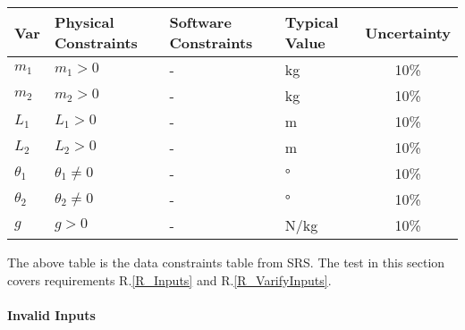 \documentclass[12pt, titlepage]{article}
\begin{document}
\begin{table}[H]
  \caption{Input Variables} \label{TblInputVar}
  \renewcommand{\arraystretch}{1.2}
\noindent \begin{longtable*}{l l l l c} 
  \toprule
  \textbf{Var} & \textbf{Physical Constraints} & \textbf{Software Constraints} &
                             \textbf{Typical Value} & \textbf{Uncertainty}\\
  \midrule 
  $m_1$ & $m_1 > 0$ & - & \si[per-mode=symbol] {\kilogram} & 10\%
  \\
  $m_2$ & $m_2 > 0$ & - & \si[per-mode=symbol] {\kilogram} & 10\%
  \\
  $L_1$ & $L_1 > 0$ & - & \si[per-mode=symbol] {\metre} & 10\%
  \\
  $L_2$ & $L_2 > 0$ & - & \si[per-mode=symbol] {\metre} & 10\%
  \\
  $\theta_1$ & $\theta_1 \neq 0$ & - & \si[per-mode=symbol] {\degree} & 10\%
  \\
  $\theta_2$ & $\theta_2 \neq 0$ & - & \si[per-mode=symbol] {\degree} & 10\%
  \\
  $g$ & $g > 0$ & - & \si[per-mode=symbol] {\newton\per\kilogram} & 10\%
  \\
  \bottomrule
\end{longtable*}
\end{table}

The above table is the data constraints table from SRS. The test in this section
covers requirements R.\ref{R_Inputs} and R.\ref{R_VarifyInputs}.


\paragraph{Invalid Inputs}
\end{document}
